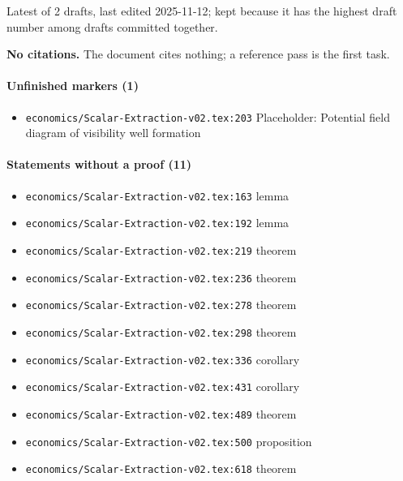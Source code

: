 \documentclass[11pt]{article}
\newcommand{\loc}[1]{{\small\color{muted}\texttt{#1}}}
\begin{document}
Latest of 2 drafts, last edited 2025-11-12; kept because it has the highest draft number among drafts committed together.

\textbf{No citations.} The document cites nothing; a reference pass is the first task.

\paragraph{Unfinished markers (1)}
\begin{itemize}
\item \loc{economics/\allowbreak{}Scalar-Extraction-v02.tex:203} Placeholder: Potential field diagram of visibility well formation
\end{itemize}
\paragraph{Statements without a proof (11)}
\begin{itemize}
\item \loc{economics/\allowbreak{}Scalar-Extraction-v02.tex:163} lemma
\item \loc{economics/\allowbreak{}Scalar-Extraction-v02.tex:192} lemma
\item \loc{economics/\allowbreak{}Scalar-Extraction-v02.tex:219} theorem
\item \loc{economics/\allowbreak{}Scalar-Extraction-v02.tex:236} theorem
\item \loc{economics/\allowbreak{}Scalar-Extraction-v02.tex:278} theorem
\item \loc{economics/\allowbreak{}Scalar-Extraction-v02.tex:298} theorem
\item \loc{economics/\allowbreak{}Scalar-Extraction-v02.tex:336} corollary
\item \loc{economics/\allowbreak{}Scalar-Extraction-v02.tex:431} corollary
\item \loc{economics/\allowbreak{}Scalar-Extraction-v02.tex:489} theorem
\item \loc{economics/\allowbreak{}Scalar-Extraction-v02.tex:500} proposition
\item \loc{economics/\allowbreak{}Scalar-Extraction-v02.tex:618} theorem
\end{itemize}
\end{document}

